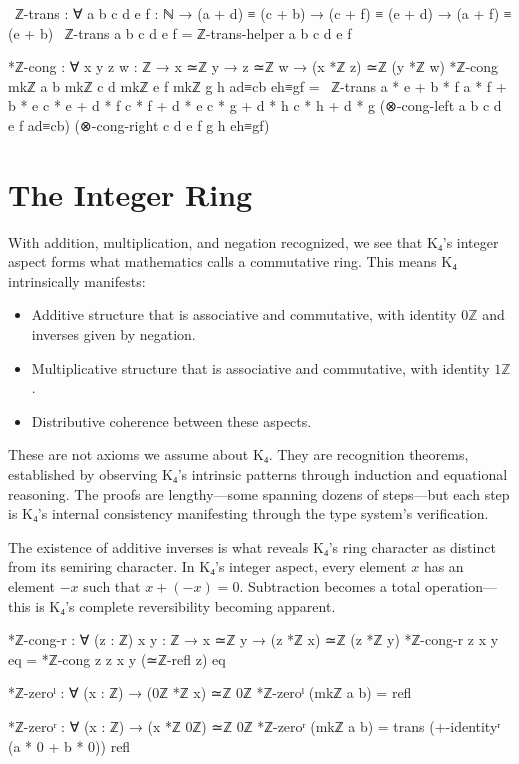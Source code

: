 \documentclass[11pt,a4paper]{book}
\begin{document}
\begin{code}
~ℤ-trans : ∀ {a b c d e f : ℕ} → (a + d) ≡ (c + b) → (c + f) ≡ (e + d) → (a + f) ≡ (e + b)
~ℤ-trans {a} {b} {c} {d} {e} {f} = ℤ-trans-helper a b c d e f

*ℤ-cong : ∀ {x y z w : ℤ} → x ≃ℤ y → z ≃ℤ w → (x *ℤ z) ≃ℤ (y *ℤ w)
*ℤ-cong {mkℤ a b} {mkℤ c d} {mkℤ e f} {mkℤ g h} ad≡cb eh≡gf =
  ~ℤ-trans {a * e + b * f} {a * f + b * e}
           {c * e + d * f} {c * f + d * e}
           {c * g + d * h} {c * h + d * g}
           (⊗-cong-left {a} {b} {c} {d} e f ad≡cb)
           (⊗-cong-right c d {e} {f} {g} {h} eh≡gf)
\end{code}

\section{The Integer Ring}

With addition, multiplication, and negation recognized, we see that K₄'s integer aspect forms what mathematics calls a commutative ring. This means K₄ intrinsically manifests:
\begin{itemize}
\item Additive structure that is associative and commutative, with identity $0\mathbb{Z}$ and 
  inverses given by negation.
\item Multiplicative structure that is associative and commutative, with identity $1\mathbb{Z}$.
\item Distributive coherence between these aspects.
\end{itemize}

These are not axioms we assume about K₄. They are recognition theorems, established by observing K₄'s intrinsic patterns through induction and equational reasoning. The proofs are lengthy—some spanning dozens of steps—but each step is K₄'s internal consistency manifesting through the type system's verification.

The existence of additive inverses is what reveals K₄'s ring character as distinct from its semiring character. In K₄'s integer aspect, every element $x$ has an element $-x$ such that $x + (-x) = 0$. Subtraction becomes a total operation—this is K₄'s complete reversibility becoming apparent.

\begin{code}
*ℤ-cong-r : ∀ (z : ℤ) {x y : ℤ} → x ≃ℤ y → (z *ℤ x) ≃ℤ (z *ℤ y)
*ℤ-cong-r z {x} {y} eq = *ℤ-cong {z} {z} {x} {y} (≃ℤ-refl z) eq

*ℤ-zeroˡ : ∀ (x : ℤ) → (0ℤ *ℤ x) ≃ℤ 0ℤ
*ℤ-zeroˡ (mkℤ a b) = refl

*ℤ-zeroʳ : ∀ (x : ℤ) → (x *ℤ 0ℤ) ≃ℤ 0ℤ
*ℤ-zeroʳ (mkℤ a b) = 
  trans (+-identityʳ (a * 0 + b * 0)) refl
\end{code}
\end{document}
